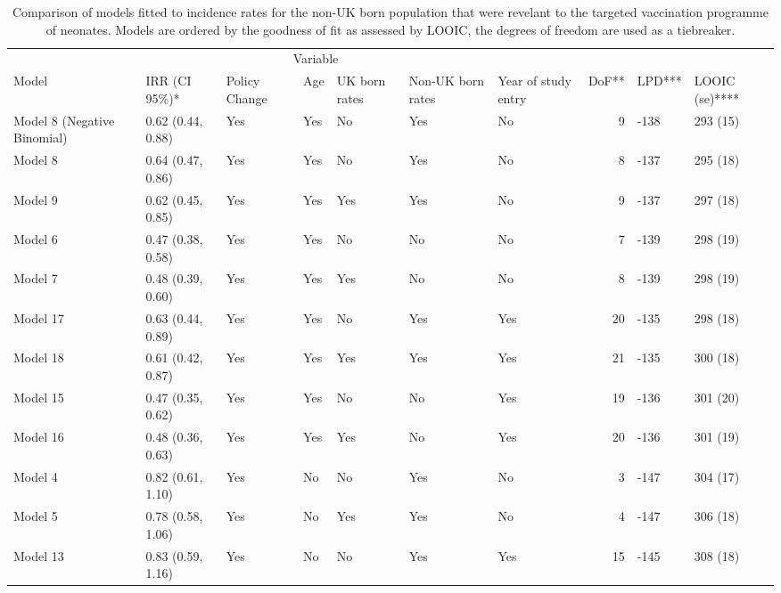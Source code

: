 \documentclass[11pt,twoside]{bristolthesis}
\begin{document}
  \begin{landscape}\begin{table}[!h]
  
  \caption[Comparison of models fitted to incidence rates for the non-UK born population that were revelant to the targeted vaccination programme of neonates.]{\label{tab:07-summary-targeted-nonukborn}Comparison of models fitted to incidence rates for the non-UK born population that were revelant to the targeted vaccination programme of neonates. Models are ordered by the goodness of fit as assessed by LOOIC, the degrees of freedom are used as a tiebreaker.}
  \centering
  \fontsize{8}{10}\selectfont
  \begin{tabular}{>{\raggedright\arraybackslash}p{3cm}llllllrll}
  \toprule
  \multicolumn{2}{c}{ } & \multicolumn{5}{c}{Variable} & \multicolumn{3}{c}{ } \\
  \cmidrule(l{3pt}r{3pt}){3-7}
  Model & IRR (CI 95\%)* & Policy Change & Age & UK born rates & Non-UK born rates & Year of study entry & DoF** & LPD*** & LOOIC (se)****\\
  \midrule
  Model 8 (Negative Binomial) & 0.62 (0.44, 0.88) & Yes & Yes & No & Yes & No & 9 & -138 & 293 (15)\\
  Model 8 & 0.64 (0.47, 0.86) & Yes & Yes & No & Yes & No & 8 & -137 & 295 (18)\\
  Model 9 & 0.62 (0.45, 0.85) & Yes & Yes & Yes & Yes & No & 9 & -137 & 297 (18)\\
  Model 6 & 0.47 (0.38, 0.58) & Yes & Yes & No & No & No & 7 & -139 & 298 (19)\\
  Model 7 & 0.48 (0.39, 0.60) & Yes & Yes & Yes & No & No & 8 & -139 & 298 (19)\\
  \addlinespace
  Model 17 & 0.63 (0.44, 0.89) & Yes & Yes & No & Yes & Yes & 20 & -135 & 298 (18)\\
  Model 18 & 0.61 (0.42, 0.87) & Yes & Yes & Yes & Yes & Yes & 21 & -135 & 300 (18)\\
  Model 15 & 0.47 (0.35, 0.62) & Yes & Yes & No & No & Yes & 19 & -136 & 301 (20)\\
  Model 16 & 0.48 (0.36, 0.63) & Yes & Yes & Yes & No & Yes & 20 & -136 & 301 (19)\\
  Model 4 & 0.82 (0.61, 1.10) & Yes & No & No & Yes & No & 3 & -147 & 304 (17)\\
  \addlinespace
  Model 5 & 0.78 (0.58, 1.06) & Yes & No & Yes & Yes & No & 4 & -147 & 306 (18)\\
  Model 13 & 0.83 (0.59, 1.16) & Yes & No & No & Yes & Yes & 15 & -145 & 308 (18)\\

\end{tabular}
\end{table}
\end{landscape}
\end{document}
